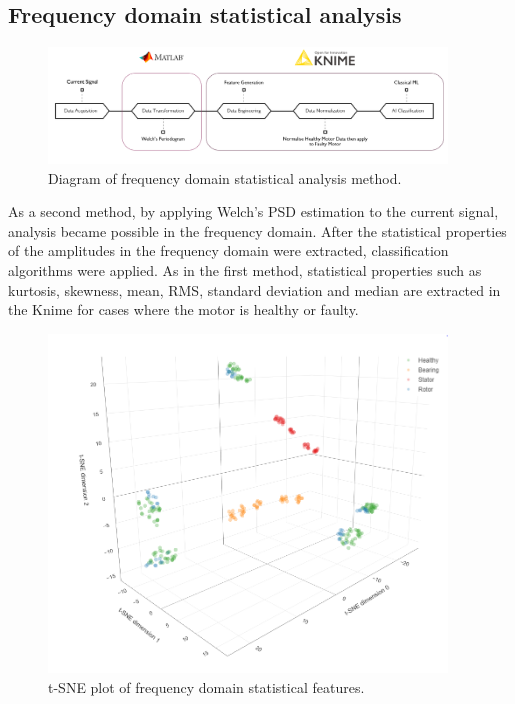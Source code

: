 \subsection{Frequency domain statistical analysis}
\begin{figure}[h]
	\centering
	\includegraphics[width=300pt,keepaspectratio=true]{./fig/method2.PNG}
	\caption{Diagram of frequency domain statistical analysis method.}	
	\label{method2}
\end{figure}
As a second method,  by applying Welch's PSD estimation to the current signal, analysis became possible in the frequency domain. After the statistical properties of the amplitudes in the frequency domain were extracted, classification algorithms were applied. As in the first method, statistical properties such as kurtosis, skewness, mean, RMS, standard deviation and median are extracted in the Knime for cases where the motor is healthy or faulty.

\begin{figure}
	\centering
	\includegraphics[width=300pt,keepaspectratio=true]{./fig/sne_psd.PNG}
	\caption{t-SNE plot of frequency domain statistical features.}	
	\label{snep}
\end{figure}

